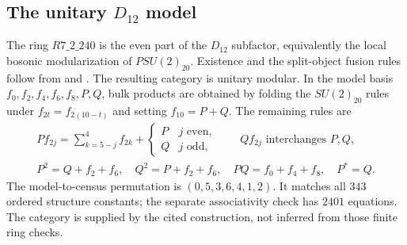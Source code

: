 \subsection{The unitary \texorpdfstring{$D_{12}$}{D12} model}
\label{sec:d12}
The ring $R7\_2\_240$ is the even part of the $D_{12}$ subfactor,
equivalently the local bosonic modularization of $PSU(2)_{20}$.
Existence and the split-object fusion rules follow from
\cite[Theorem~4.14]{MPSskein} and
\cite[Theorem~2.2 and Proposition~2.4]{MPSknots}.
The resulting category is unitary modular. In the model basis
$f_0,f_2,f_4,f_6,f_8,P,Q$, bulk products are obtained by folding the
$SU(2)_{20}$ rules under $f_{2t}=f_{2(10-t)}$ and setting
$f_{10}=P+Q$. The remaining rules are
\[
\begin{gathered}
P f_{2j}=\sum_{k=5-j}^{4}f_{2k}
 +\begin{cases}P&j\text{ even},\\Q&j\text{ odd},\end{cases}
\qquad Q f_{2j}\text{ interchanges }P,Q,\\
P^2=Q+f_2+f_6,\quad Q^2=P+f_2+f_6,
\quad PQ=f_0+f_4+f_8,\quad P^*=Q.
\end{gathered}
\]
The model-to-census permutation is $(0,5,3,6,4,1,2)$. It matches all
$343$ ordered structure constants; the separate associativity check has
$2401$ equations. The category is supplied by the cited construction,
not inferred from those finite ring checks.
